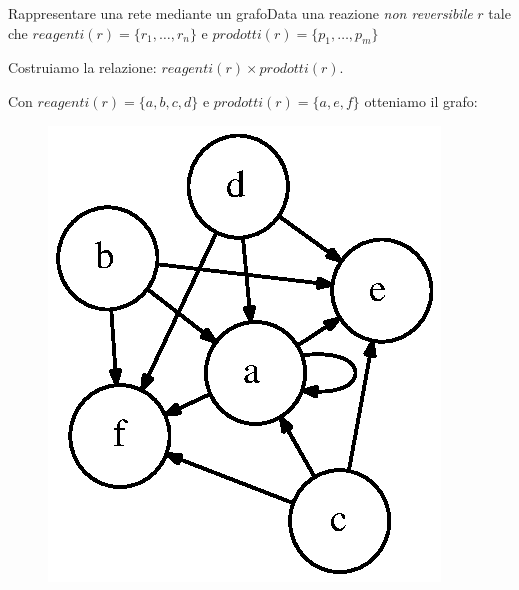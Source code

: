 \documentclass{beamer}
\begin{document}
\begin{frame}{Rappresentare una rete mediante un grafo}{Data una
    reazione \emph{non reversibile} $r$ tale che $reagenti(r) = \{ r_{1},
    \ldots, r_{n} \}$ e $prodotti(r) = \{ p_{1}, \ldots, p_{m} \}$}

  Costruiamo la relazione: $reagenti(r) \times prodotti(r)$.
  
    \begin{example}
      Con $reagenti(r) = \{ a, b, c, d \}$ e $prodotti(r) = \{a, e,
      f\}$ otteniamo il grafo:
      \begin{figure}
        \centering
        \includegraphics[scale=.6]{images/non-reversible-reaction-example.dot.eps}
        \label{fig:non-reversible-reaction-mapping}
      \end{figure}
    \end{example}
\end{frame}
\end{document}
